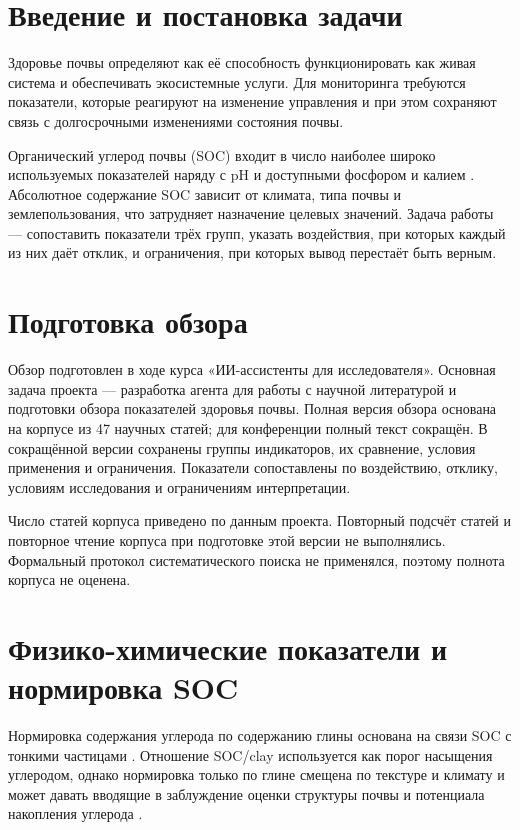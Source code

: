 \documentclass{ai4science_ysda}
\begin{document}
\section*{Введение и постановка задачи}

\porozhdeno{} Здоровье почвы определяют как её способность функционировать
как живая система и обеспечивать экосистемные услуги. Для мониторинга
требуются показатели, которые реагируют на изменение управления и при этом
сохраняют связь с долгосрочными изменениями состояния почвы.

Органический углерод почвы (SOC) входит в число наиболее широко
используемых показателей наряду с pH и доступными фосфором и калием
\cite{bunemann2018}. Абсолютное содержание SOC зависит от климата, типа
почвы и землепользования, что затрудняет назначение целевых значений.
Задача работы — сопоставить показатели трёх групп, указать воздействия, при
которых каждый из них даёт отклик, и ограничения, при которых вывод
перестаёт быть верным.

\section{Подготовка обзора}

\porozhdeno{} Обзор подготовлен в ходе курса «ИИ-ассистенты для
исследователя». Основная задача проекта — разработка агента для работы с
научной литературой и подготовки обзора показателей здоровья почвы. Полная
версия обзора основана на корпусе из 47 научных статей; для конференции
полный текст сокращён. В сокращённой версии сохранены группы индикаторов,
их сравнение, условия применения и ограничения. Показатели сопоставлены по
воздействию, отклику, условиям исследования и ограничениям интерпретации.

Число статей корпуса приведено по данным проекта. Повторный подсчёт статей
и повторное чтение корпуса при подготовке этой версии не выполнялись.
Формальный протокол систематического поиска не применялся, поэтому полнота
корпуса не оценена.

\section{Физико-химические показатели и нормировка SOC}

\porozhdeno{} Нормировка содержания углерода по содержанию глины основана
на связи SOC с тонкими частицами \cite{feeney2024}. Отношение SOC/clay
используется как порог насыщения углеродом, однако нормировка только по
глине смещена по текстуре и климату и может давать вводящие в заблуждение
оценки структуры почвы и потенциала накопления углерода \cite{feeney2024}.
\end{document}
